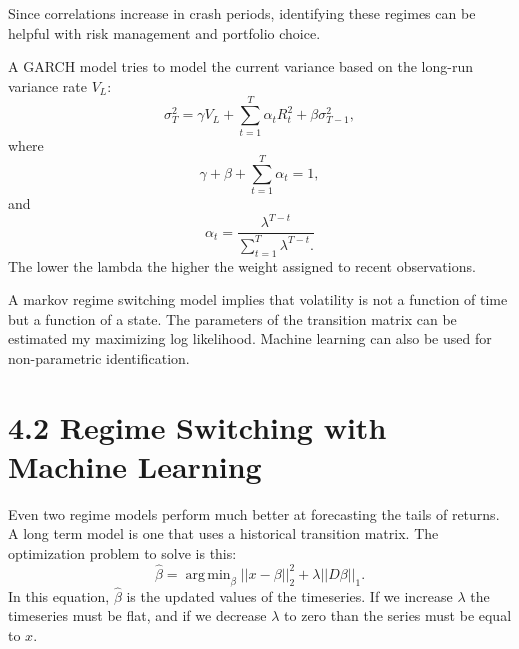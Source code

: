\documentclass{article}
\DeclareMathOperator*{\argmin}{arg\,min}
\begin{document}
Since correlations increase in crash periods,
identifying these regimes can be helpful with
risk management and portfolio choice.

A GARCH model tries to model the current variance
based on the long-run variance rate $V_L$:
\[
\sigma_T^2 = \gamma V_L + 
\sum_{t=1}^T \alpha_t R_t^2 + \beta \sigma_{T-1}^2,
\]
where
\[ \gamma + \beta + \sum_{t=1}^T \alpha_t = 1,\]
and \[ \alpha_t = \frac{\lambda^{T-t}}{\sum_{t=1}^T \lambda^{T-t}.}\]
The lower the lambda the higher the weight assigned to recent
observations. 

A markov regime switching model implies that volatility is
not a function of time but a function of a state. 
The parameters of the transition matrix can be estimated 
my maximizing log likelihood. Machine learning can also be used
for non-parametric identification.

\section*{4.2 Regime Switching with Machine Learning}

Even two regime models perform much better at forecasting
the tails of returns. A long term model is one that uses
a historical transition matrix. The optimization problem to solve
is this:
\[
\hat{\beta} = \argmin_\beta  || x-\beta||_2^2 + \lambda||D\beta||_1. 
\]
In this equation, $\hat{\beta}$ is the updated values of the timeseries.
If we increase $\lambda$ the timeseries must be flat, and if we 
decrease $\lambda$ to zero than the series must be equal to $x$. 
\end{document}
